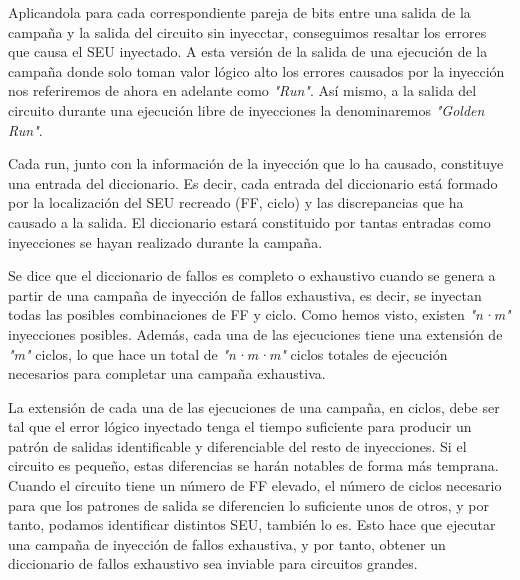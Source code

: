 
Aplicandola para cada correspondiente pareja de bits entre una salida de la 
campaña y la salida del circuito sin inyecctar, conseguimos resaltar los errores
que causa el \gls{SEU} inyectado. A esta versión de la salida de una ejecución de
la campaña donde solo toman valor lógico alto los errores causados por la
inyección nos referiremos de ahora en adelante como \textit{"Run"}. Así mismo, a 
la salida del circuito durante una ejecución libre de inyecciones la denominaremos
\textit{"Golden Run"}.

Cada run, junto con la información de la inyección que lo ha causado, constituye
una entrada del diccionario. Es decir, cada entrada del diccionario está formado
por la localización del \gls{SEU} recreado (\gls{FF}, ciclo) y las discrepancias 
que ha causado a la salida. El diccionario estará constituido por tantas entradas 
como inyecciones se hayan realizado durante la campaña.

Se dice que el diccionario de fallos es completo o exhaustivo cuando se genera a
partir de una campaña de inyección de fallos exhaustiva, es decir, se inyectan
todas las posibles combinaciones de \gls{FF} y ciclo. 
Como hemos visto, existen \textit{"n·m"} inyecciones posibles. Además, cada una de 
las ejecuciones tiene una extensión de \textit{"m"} ciclos, lo que hace un total 
de  \textit{"n·m·m"} ciclos totales de ejecución necesarios para completar una
campaña exhaustiva.

La extensión de cada una de las ejecuciones de una campaña, en ciclos, debe ser
tal que el error lógico inyectado tenga el tiempo suficiente para producir un 
patrón de salidas identificable y diferenciable del resto de inyecciones. Si el
circuito es pequeño, estas diferencias se harán notables de forma más temprana.
Cuando el circuito tiene un número de \gls{FF} elevado, el número de ciclos
necesario para que los patrones de salida se diferencien lo suficiente unos de 
otros, y por tanto, podamos identificar distintos \gls{SEU}, también lo es. Esto
hace que ejecutar una campaña de inyección de fallos exhaustiva, y por tanto, 
obtener un diccionario de fallos exhaustivo sea inviable para circuitos grandes.

